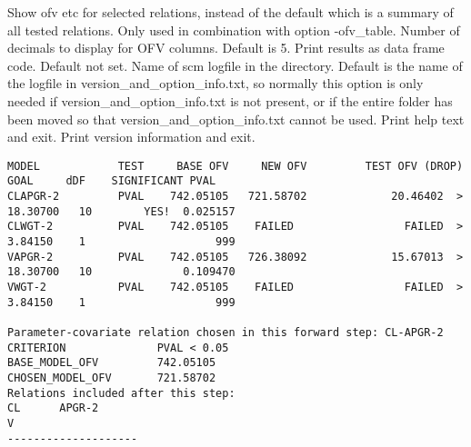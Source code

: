 \begin{optionlist}
Show ofv etc for selected relations, instead of the default which is
a summary of all tested relations.
\nextopt
{}
Only used in combination with option -ofv\_table.
Number of decimals to display for OFV columns. Default is 5.
\nextopt
{}
Print results as data frame code. Default not set.
\nextopt
{}
Name of scm logfile in the directory. 
Default is the name of the logfile in
version\_and\_option\_info.txt, 
so normally this option is only needed if version\_and\_option\_info.txt is not present,
or if the entire folder has been moved so that version\_and\_option\_info.txt cannot be used.
\nextopt
{}
Print help text and exit.
\nextopt
{}
Print version information and exit.
\end{optionlist}







{\tiny
\begin{verbatim}
MODEL            TEST     BASE OFV     NEW OFV         TEST OFV (DROP)    GOAL     dDF    SIGNIFICANT PVAL
CLAPGR-2         PVAL    742.05105   721.58702             20.46402  >  18.30700   10        YES!  0.025157 
CLWGT-2          PVAL    742.05105    FAILED                 FAILED  >   3.84150    1                    999
VAPGR-2          PVAL    742.05105   726.38092             15.67013  >  18.30700   10              0.109470 
VWGT-2           PVAL    742.05105    FAILED                 FAILED  >   3.84150    1                    999

Parameter-covariate relation chosen in this forward step: CL-APGR-2
CRITERION              PVAL < 0.05
BASE_MODEL_OFV         742.05105
CHOSEN_MODEL_OFV       721.58702
Relations included after this step:
CL      APGR-2  
V       
--------------------
\end{verbatim}
}
